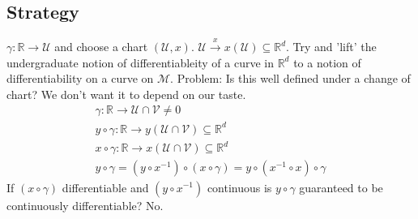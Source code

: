 \documentclass[10pt, oneside]{article}
\newcommand{\R}{\mathbb{R}}
\newcommand{\M}{\mathcal{M}}
\begin{document}
  \subsection{Strategy}
     $\gamma: \R \to \mathcal{U}$ and choose a chart $(\mathcal{U},x)$. $\mathcal{U} \xrightarrow{x} x(\mathcal{U}) \subseteq \R^d$.
     Try and 'lift' the undergraduate notion of differentiableity of a curve in $\R^d$ to a notion of differentiability on a curve on $\M$.
     Problem: Is this well defined under a change of chart? We don't want it to depend on our taste.
     \begin{align}
        \gamma: \R \to\mathcal{U} \cap \mathcal{V} \neq 0 \\
        y \circ \gamma: \R \to y(\mathcal{U} \cap \mathcal{V}) \subseteq \R^d \\
        x \circ \gamma: \R \to x(\mathcal{U} \cap \mathcal{V}) \subseteq \R^d \\
        y \circ \gamma = (y \circ x^{-1}) \circ (x \circ \gamma) = y \circ (x^{-1} \circ x) \circ \gamma
     \end{align}
     If $(x \circ \gamma)$ differentiable and $(y \circ x^{-1})$ continuous is $y \circ \gamma$ guaranteed to be continuously differentiable? No.
\end{document}
